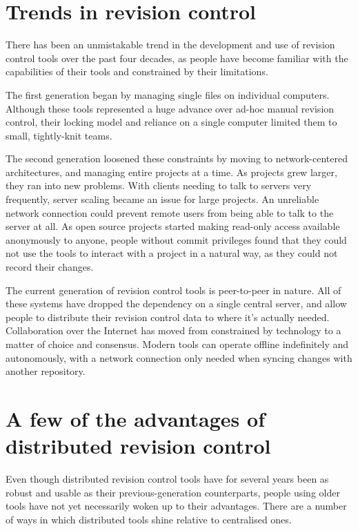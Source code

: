 \section{Trends in revision control}

There has been an unmistakable trend in the development and use of
revision control tools over the past four decades, as people have
become familiar with the capabilities of their tools and constrained
by their limitations.

The first generation began by managing single files on individual
computers.  Although these tools represented a huge advance over
ad-hoc manual revision control, their locking model and reliance on a
single computer limited them to small, tightly-knit teams.

The second generation loosened these constraints by moving to
network-centered architectures, and managing entire projects at a
time.  As projects grew larger, they ran into new problems.  With
clients needing to talk to servers very frequently, server scaling
became an issue for large projects.  An unreliable network connection
could prevent remote users from being able to talk to the server at
all.  As open source projects started making read-only access
available anonymously to anyone, people without commit privileges
found that they could not use the tools to interact with a project in
a natural way, as they could not record their changes.

The current generation of revision control tools is peer-to-peer in
nature.  All of these systems have dropped the dependency on a single
central server, and allow people to distribute their revision control
data to where it's actually needed.  Collaboration over the Internet
has moved from constrained by technology to a matter of choice and
consensus.  Modern tools can operate offline indefinitely and
autonomously, with a network connection only needed when syncing
changes with another repository.

\section{A few of the advantages of distributed revision control}

Even though distributed revision control tools have for several years
been as robust and usable as their previous-generation counterparts,
people using older tools have not yet necessarily woken up to their
advantages.  There are a number of ways in which distributed tools
shine relative to centralised ones.

